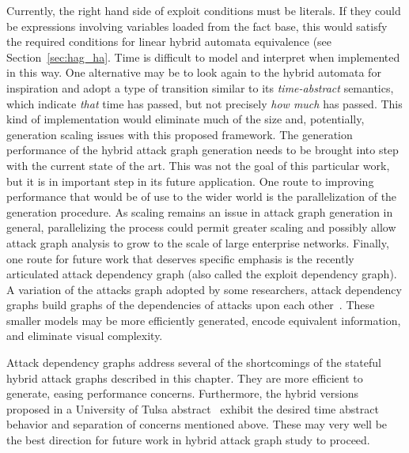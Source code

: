Currently, the right hand side of exploit conditions must be literals. If they
could be expressions involving variables loaded from the fact base, this would 
satisfy the required conditions for linear hybrid automata equivalence (see
Section~\ref{sec:hag_ha}.
Time is difficult to model and interpret when implemented in this way. One
alternative may be to look again to the hybrid automata for inspiration and
adopt a type of transition similar to its \emph{time-abstract} semantics,
which indicate \emph{that} time has passed, but not precisely \emph{how much}
has passed. This kind of implementation would eliminate much of the size and,
potentially, generation scaling issues with this proposed framework.
The generation performance of the hybrid attack graph generation needs to be
brought into step with the current state of the art. This was not the goal of
this particular work, but it is in important step in its future application.
One route to improving performance that would be of use to the wider world is
the parallelization of the generation procedure. As scaling remains an issue
in attack graph generation in general, parallelizing the process could permit
greater scaling and possibly allow attack graph analysis to grow to the scale
of large enterprise networks.
Finally, one route for future work that deserves specific emphasis is the recently
articulated attack dependency graph (also called the exploit dependency graph).
A variation of the attacks graph adopted by some researchers, attack dependency
graphs build graphs of the dependencies of attacks upon each 
other~\cite{jajodia2005topological, noel2004managing}. These smaller models may
be more efficiently generated, encode equivalent information, and eliminate 
visual complexity.

Attack dependency graphs address several of the shortcomings of the stateful
hybrid attack graphs described in this chapter. They are more efficient to
generate, easing performance concerns. Furthermore, the hybrid versions proposed
in a University of Tulsa abstract~\cite{louthan2011toward} exhibit the
desired time abstract behavior and separation of concerns mentioned above. These
may very well be the best direction for future work in hybrid attack graph
study to proceed.
